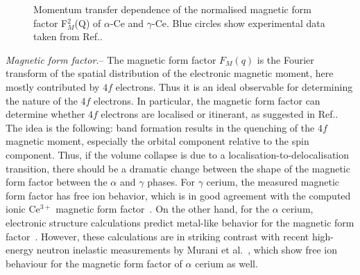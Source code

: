 \documentclass[10pt]{ruthesis}
\begin{document}
{%
%
\begin{figure}[!t]
\caption{Momentum transfer dependence of the normalised magnetic form factor F$^2_M$(Q) of $\alpha$-Ce and $\gamma$-Ce. Blue circles show experimental data taken from Ref.\cite{murani}. 
}
\label{fig1_Ce}
\end{figure}
%



{\it Magnetic form factor.}-- The magnetic form factor $F_M(q)$ is the
Fourier transform of the spatial distribution of the electronic
magnetic moment, here mostly contributed by $4f$ electrons. Thus it is
an ideal observable for determining the nature of the $4f$ electrons.
In particular, the magnetic form factor can determine whether $4f$
electrons are localised or itinerant, as suggested in
Ref.\cite{hjelm1994}. The idea is the following: band formation
results in the quenching of the $4f$ magnetic moment, especially the
orbital component relative to the spin component. Thus, if the volume
collapse is due to a localisation-to-delocalisation transition, there
should be a dramatic change between the shape of the magnetic form
factor between the $\alpha$ and $\gamma$ phases.  For $\gamma$ cerium,
the measured magnetic form factor has free ion behavior, which is in
good agreement with the computed ionic Ce$^{3+}$ magnetic form
factor~\cite{stassis}.  On the other hand, for the $\alpha$ cerium,
electronic structure calculations predict metal-like behavior for the
magnetic form factor~\cite{hjelm1994}.  However, these calculations
are in striking contrast with recent high-energy neutron inelastic
measurements by Murani et al.~\cite{murani}, which show free ion
behaviour for the magnetic form factor of $\alpha$ cerium as well.


}
\end{document}

